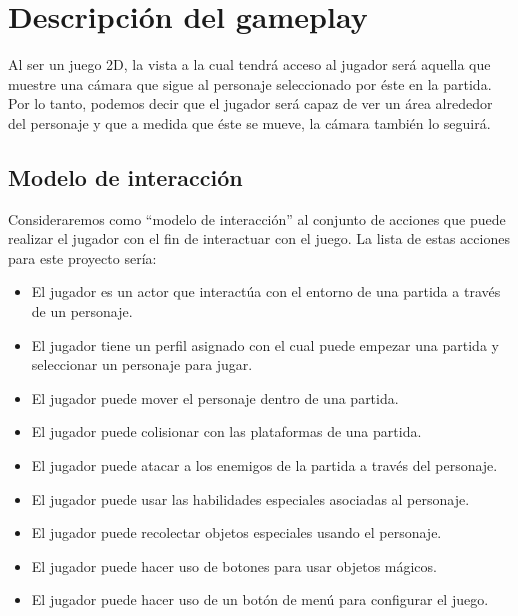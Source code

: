 \section{Descripción del gameplay} %



Al ser un juego 2D, la vista a la cual tendrá acceso al jugador será aquella que
muestre una cámara que sigue al personaje seleccionado por éste en la
partida.
Por lo tanto, podemos decir que el jugador será capaz de ver un área alrededor
del personaje y que a medida que éste se mueve, la cámara también lo seguirá.

\subsection{Modelo de interacción}

Consideraremos como “modelo de interacción” al conjunto de acciones que puede
realizar el jugador con el fin de interactuar con el juego. La lista de estas
acciones para este proyecto sería:

\begin{itemize}
    \item El jugador es un actor que interactúa con el entorno de una partida a
    través de un personaje.
    \item El jugador tiene un perfil asignado con el cual puede empezar una
    partida y seleccionar un personaje para jugar.
    \item El jugador puede mover el personaje dentro de una partida.
    \item El jugador puede colisionar con las plataformas de una partida.
    \item El jugador puede atacar a los enemigos de la partida a través del
    personaje.
    \item El jugador puede usar las habilidades especiales asociadas al
    personaje.
    \item El jugador puede recolectar objetos especiales usando el personaje.
    \item El jugador puede hacer uso de botones para usar objetos mágicos.
    \item El jugador puede hacer uso de un botón de menú para configurar el
    juego.
\end{itemize}

